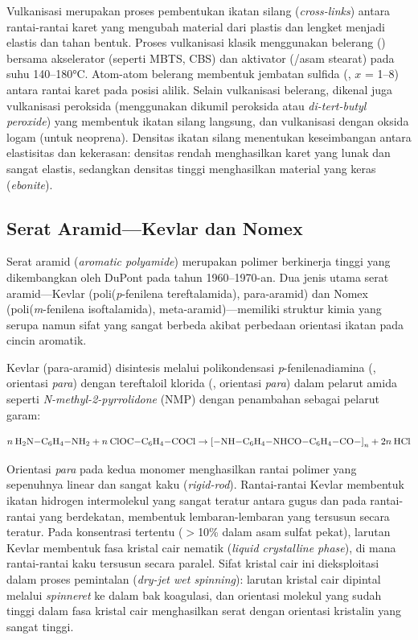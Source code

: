 \documentclass[12pt,a4paper,openany]{book}
\begin{document}
Vulkanisasi merupakan proses pembentukan ikatan silang (\textit{cross-links}) antara rantai-rantai karet yang mengubah material dari plastis dan lengket menjadi elastis dan tahan bentuk. Proses vulkanisasi klasik menggunakan belerang () bersama akselerator (seperti MBTS, CBS) dan aktivator (/asam stearat) pada suhu 140--180°C. Atom-atom belerang membentuk jembatan sulfida (, $x$ = 1--8) antara rantai karet pada posisi alilik. Selain vulkanisasi belerang, dikenal juga vulkanisasi peroksida (menggunakan dikumil peroksida atau \textit{di-tert-butyl peroxide}) yang membentuk ikatan silang  langsung, dan vulkanisasi dengan oksida logam (untuk neoprena). Densitas ikatan silang menentukan keseimbangan antara elastisitas dan kekerasan: densitas rendah menghasilkan karet yang lunak dan sangat elastis, sedangkan densitas tinggi menghasilkan material yang keras (\textit{ebonite}).

\subsection{Serat Aramid---Kevlar dan Nomex}
\label{subsec:aramid}

Serat aramid (\textit{aromatic polyamide}) merupakan polimer berkinerja tinggi yang dikembangkan oleh DuPont pada tahun 1960--1970-an. Dua jenis utama serat aramid---Kevlar (poli(\textit{p}-fenilena tereftalamida), para-aramid) dan Nomex (poli(\textit{m}-fenilena isoftalamida), meta-aramid)---memiliki struktur kimia yang serupa namun sifat yang sangat berbeda akibat perbedaan orientasi ikatan pada cincin aromatik.

Kevlar (para-aramid) disintesis melalui polikondensasi \textit{p}-fenilenadiamina (, orientasi \textit{para}) dengan tereftaloil klorida (, orientasi \textit{para}) dalam pelarut amida seperti \textit{N-methyl-2-pyrrolidone} (NMP) dengan penambahan  sebagai pelarut garam:

\begin{equation}
n\:\ce{H2N-C6H4-NH2} + n\:\ce{ClOC-C6H4-COCl} \rightarrow \ce{[-NH-C6H4-NHCO-C6H4-CO-]}_n + 2n\:\ce{HCl}
\end{equation}

Orientasi \textit{para} pada kedua monomer menghasilkan rantai polimer yang sepenuhnya linear dan sangat kaku (\textit{rigid-rod}). Rantai-rantai Kevlar membentuk ikatan hidrogen intermolekul yang sangat teratur antara gugus  dan  pada rantai-rantai yang berdekatan, membentuk lembaran-lembaran yang tersusun secara teratur. Pada konsentrasi tertentu ($>$10\% dalam asam sulfat pekat), larutan Kevlar membentuk fasa kristal cair nematik (\textit{liquid crystalline phase}), di mana rantai-rantai kaku tersusun secara paralel. Sifat kristal cair ini dieksploitasi dalam proses pemintalan (\textit{dry-jet wet spinning}): larutan kristal cair dipintal melalui \textit{spinneret} ke dalam bak koagulasi, dan orientasi molekul yang sudah tinggi dalam fasa kristal cair menghasilkan serat dengan orientasi kristalin yang sangat tinggi.
\end{document}
